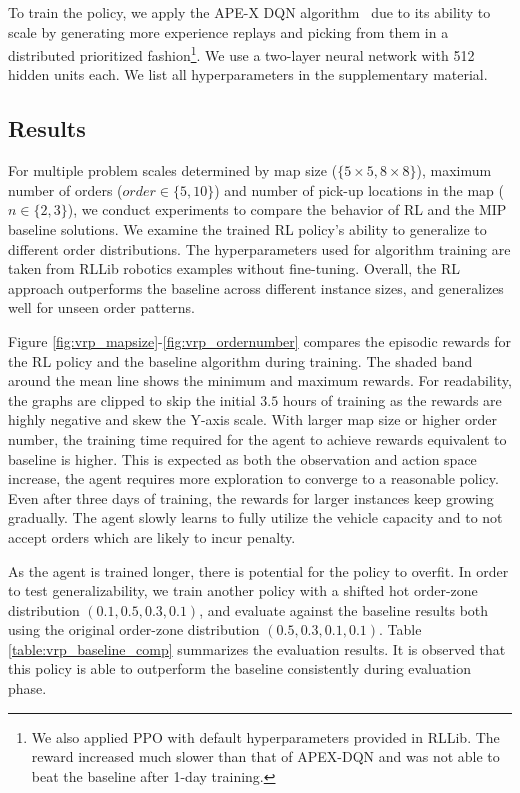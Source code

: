\documentclass[letterpaper]{article} %
\begin{document}
To train the policy, we apply the APE-X DQN algorithm~\cite{horgan2018distributed} due to its ability to scale by generating more experience replays and picking from them in a distributed prioritized fashion\footnote{We also applied PPO with default hyperparameters provided in RLLib. The reward increased much slower than that of APEX-DQN and was not able to beat the baseline after 1-day training.}. We use a two-layer neural network with 512 hidden units each. We list all hyperparameters in the supplementary material.

\subsection{Results}
For multiple problem scales determined by map size ($\{5 \times 5, 8 \times 8\}$), maximum number of orders ($order \in \{5, 10\}$) and number of pick-up locations in the map ($n \in \{2, 3\}$), we conduct experiments to compare the behavior of RL and the MIP baseline solutions. We examine the trained RL policy's ability to generalize to different order distributions. The hyperparameters used for algorithm training are taken from RLLib robotics examples without fine-tuning. Overall, the RL approach outperforms the baseline across different instance sizes, and generalizes well for unseen order patterns. 

Figure \ref{fig:vrp_mapsize}-\ref{fig:vrp_ordernumber} compares the episodic rewards for the RL policy and the baseline algorithm during training. The shaded band around the mean line shows the minimum and maximum rewards. For readability, the graphs are clipped to skip the initial $3.5$ hours of training as the rewards are highly negative and skew the Y-axis scale. With larger map size or higher order number, the training time required for the agent to achieve rewards equivalent to baseline is higher. This is expected as both the observation and action space increase, the agent requires more exploration to converge to a reasonable policy. Even after three days of training, the rewards for larger instances keep growing gradually. The agent slowly learns to fully utilize the vehicle capacity and to not accept orders which are likely to incur penalty. %

As the agent is trained longer, there is potential for the policy to overfit. In order to test generalizability, we train another policy with a shifted hot order-zone distribution $(0.1, 0.5, 0.3, 0.1)$, and evaluate against the baseline results both using the original order-zone distribution $(0.5, 0.3, 0.1, 0.1)$. Table \ref{table:vrp_baseline_comp} summarizes the evaluation results. It is observed that this policy is able to outperform the baseline consistently during evaluation phase.
\end{document}
